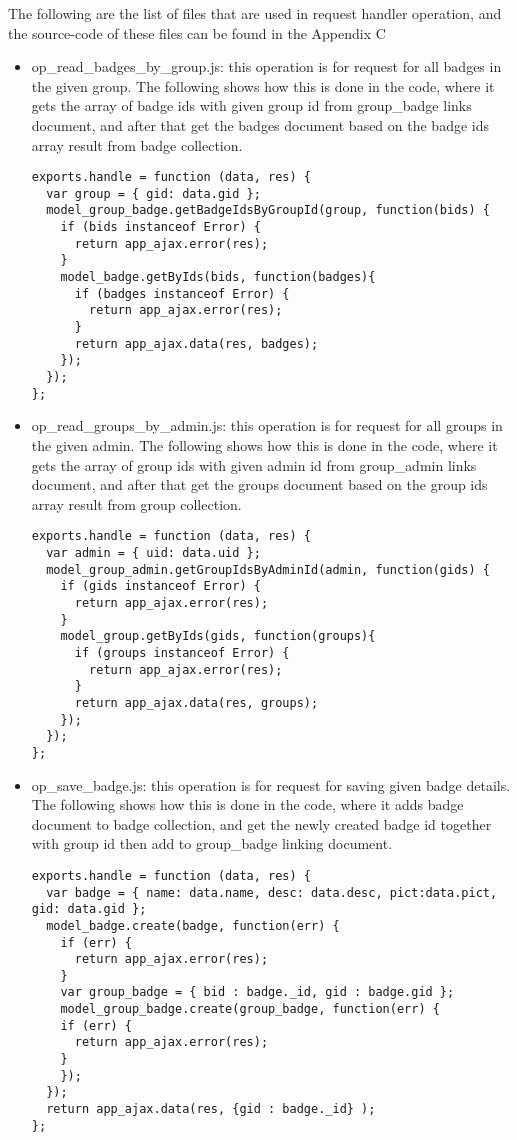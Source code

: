 The following are the list of files that are used in request handler operation, and the source-code of these files can be found in the Appendix C

\begin{itemize}
\item op{\_}read{\_}badges{\_}by{\_}group.js: this operation is for request for all badges in the given group. The following shows how this is done in the code, where it gets the array of badge ids with given group id from group{\_}badge links document, and after that get the badges document based on the badge ids array result from badge collection. 

\begin{lstlisting}
exports.handle = function (data, res) {
  var group = { gid: data.gid };
  model_group_badge.getBadgeIdsByGroupId(group, function(bids) {
    if (bids instanceof Error) {
      return app_ajax.error(res);
    }
    model_badge.getByIds(bids, function(badges){
      if (badges instanceof Error) {
        return app_ajax.error(res);
      }
      return app_ajax.data(res, badges);
    });
  });
};
\end{lstlisting}

\item op{\_}read{\_}groups{\_}by{\_}admin.js: this operation is for request for all groups in the given admin. The following shows how this is done in the code, where it gets the array of group ids with given admin id from group{\_}admin links document, and after that get the groups document based on the group ids array result from group collection.

\begin{lstlisting}
exports.handle = function (data, res) {
  var admin = { uid: data.uid };
  model_group_admin.getGroupIdsByAdminId(admin, function(gids) {
    if (gids instanceof Error) {
      return app_ajax.error(res);
    }
    model_group.getByIds(gids, function(groups){
      if (groups instanceof Error) {
        return app_ajax.error(res);
      }
      return app_ajax.data(res, groups);
    });
  });
};
\end{lstlisting}

\item op{\_}save{\_}badge.js: this operation is for request for saving given badge details. The following shows how this is done in the code, where it adds badge document to badge collection, and get the newly created badge id together with group id then add to group{\_}badge linking document. 

\begin{lstlisting}
exports.handle = function (data, res) {
  var badge = { name: data.name, desc: data.desc, pict:data.pict, gid: data.gid };
  model_badge.create(badge, function(err) {
    if (err) {
      return app_ajax.error(res);
    }
    var group_badge = { bid : badge._id, gid : badge.gid };
    model_group_badge.create(group_badge, function(err) {
    if (err) {
      return app_ajax.error(res);
    }
    });
  });
  return app_ajax.data(res, {gid : badge._id} );  
};
\end{lstlisting}


\end{itemize}
